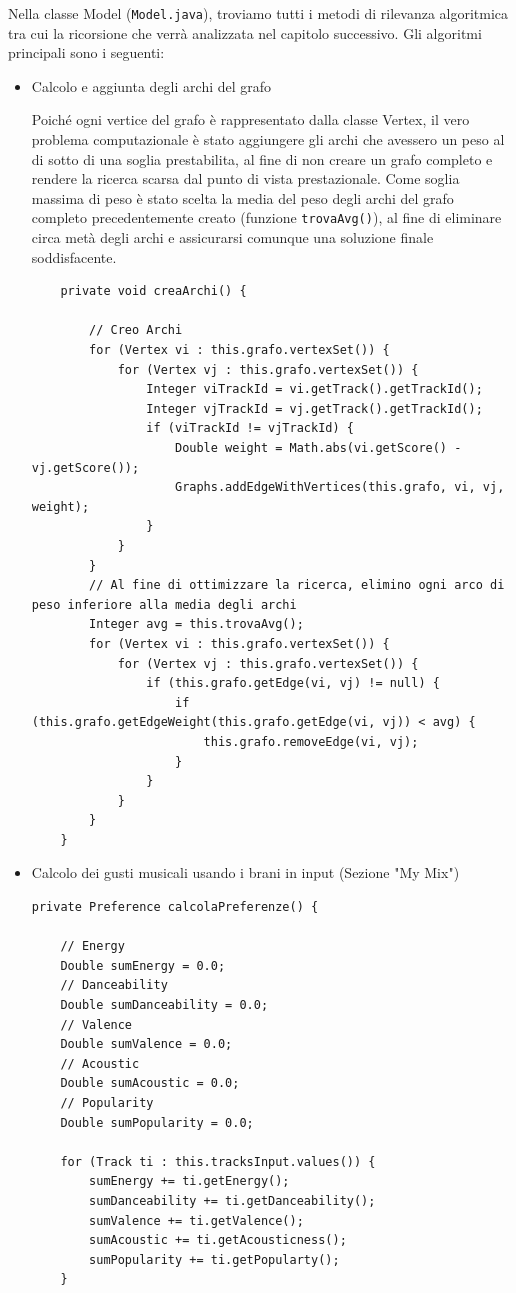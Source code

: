 \documentclass[12pt, a4paper]{article}
\begin{document}
Nella classe Model (\texttt{Model.java}), troviamo tutti i metodi di rilevanza algoritmica tra cui la ricorsione che verrà analizzata nel capitolo successivo.
Gli algoritmi principali sono i seguenti:
\begin{itemize}
\item Calcolo e aggiunta degli archi del grafo

Poiché ogni vertice del grafo è rappresentato dalla classe Vertex, il vero problema computazionale è stato aggiungere gli archi che avessero un peso al di sotto di una soglia prestabilita, al fine di non creare un grafo completo e rendere la ricerca scarsa dal punto di vista prestazionale.
Come soglia massima di peso è stato scelta la media del peso degli archi del grafo completo precedentemente creato (funzione \texttt{trovaAvg()}), al fine di eliminare circa metà degli archi e assicurarsi comunque una soluzione finale soddisfacente.
\begin{lstlisting}
	private void creaArchi() {

		// Creo Archi
		for (Vertex vi : this.grafo.vertexSet()) {
			for (Vertex vj : this.grafo.vertexSet()) {
				Integer viTrackId = vi.getTrack().getTrackId();
				Integer vjTrackId = vj.getTrack().getTrackId();
				if (viTrackId != vjTrackId) {
					Double weight = Math.abs(vi.getScore() - vj.getScore());
					Graphs.addEdgeWithVertices(this.grafo, vi, vj, weight);
				}
			}
		}
		// Al fine di ottimizzare la ricerca, elimino ogni arco di peso inferiore alla media degli archi
		Integer avg = this.trovaAvg();
		for (Vertex vi : this.grafo.vertexSet()) {
			for (Vertex vj : this.grafo.vertexSet()) {
				if (this.grafo.getEdge(vi, vj) != null) {
					if (this.grafo.getEdgeWeight(this.grafo.getEdge(vi, vj)) < avg) {
						this.grafo.removeEdge(vi, vj);
					}
				}
			}
		}
	}
\end{lstlisting}
\newpage
\item Calcolo dei gusti musicali usando i brani in input (Sezione "My Mix")

\begin{lstlisting}
private Preference calcolaPreferenze() {

	// Energy
	Double sumEnergy = 0.0;
	// Danceability
	Double sumDanceability = 0.0;
	// Valence
	Double sumValence = 0.0;
	// Acoustic
	Double sumAcoustic = 0.0;
	// Popularity
	Double sumPopularity = 0.0;

	for (Track ti : this.tracksInput.values()) {
		sumEnergy += ti.getEnergy();
		sumDanceability += ti.getDanceability();
		sumValence += ti.getValence();
		sumAcoustic += ti.getAcousticness();
		sumPopularity += ti.getPopularty();
	}


\end{lstlisting}
\end{itemize}
\end{document}
